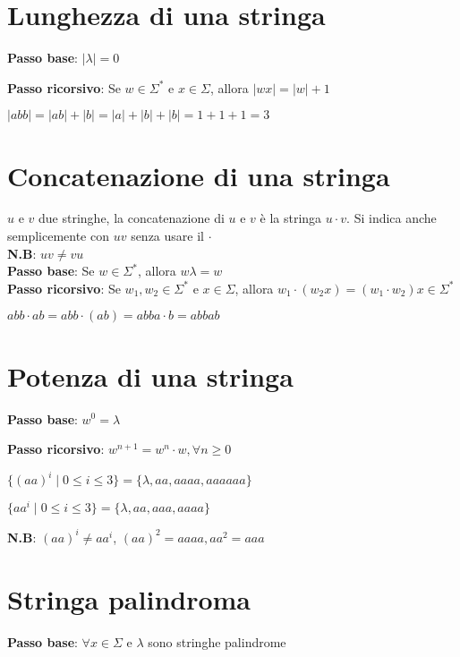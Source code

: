\section{Lunghezza di una stringa}
\textbf{Passo base}: $|\lambda| = 0$

\textbf{Passo ricorsivo}: Se $w \in \Sigma^*$ e $x \in \Sigma$, allora $|wx| = |w| + 1$

\begin{example}
$|abb| = |ab| + |b| = |a| + |b| + |b| = 1 + 1 + 1 = 3$
\end{example}

\section{Concatenazione di una stringa}
$u$ e $v$ due stringhe, la concatenazione di $u$ e $v$ è la stringa $u \cdot v$. Si indica anche semplicemente con $uv$ senza usare il $\cdot$ \\
\textbf{N.B}: $uv \neq vu$ \\
\textbf{Passo base}: Se $w \in \Sigma^*$, allora $w \lambda = w$ \\
\textbf{Passo ricorsivo}: Se $w_1, w_2 \in \Sigma^*$ e $x \in \Sigma$, allora $w_1 \cdot (w_2x) = (w_1 \cdot w_2)x \in \Sigma^*$
\begin{example}
$abb \cdot ab = abb \cdot (ab) = abba \cdot b = abbab$
\end{example}

\section{Potenza di una stringa}
\textbf{Passo base}: $w^0 = \lambda$

\textbf{Passo ricorsivo}: $w^{n + 1} = w^n \cdot w, \forall n \geq 0$
\begin{example}
$\{(aa)^i \mid 0 \leq i \leq 3\} = \{ \lambda, aa, aaaa, aaaaaa\}$
\end{example}
\begin{example}
$\{aa^i \mid 0 \leq i \leq 3\} = \{ \lambda, aa, aaa, aaaa\}$
\end{example}
\textbf{N.B}: $(aa)^i \neq aa^i$, $(aa)^2 = aaaa, aa^2 = aaa$

\section{Stringa palindroma}
\textbf{Passo base}: $\forall x \in \Sigma$ e $\lambda$ sono stringhe palindrome

